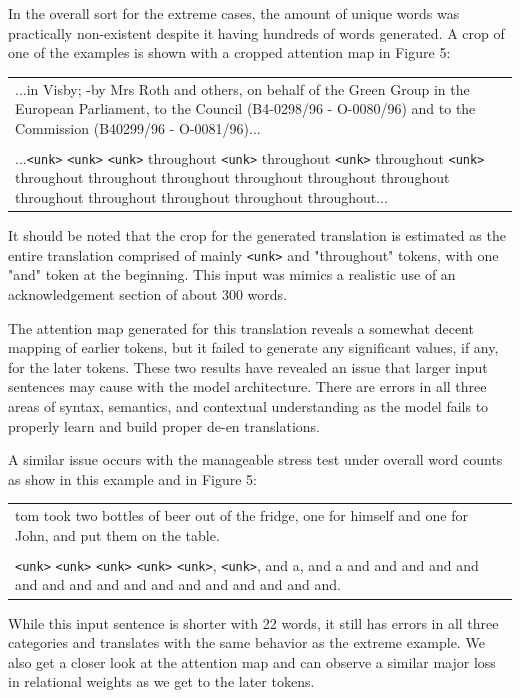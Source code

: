 \documentclass[11pt,a4paper]{article}
\begin{document}
In the overall sort for the extreme cases, the amount of unique words was practically non-existent despite it having hundreds of words generated. A crop of one of the examples is shown with a cropped attention map in Figure 5:
\begin{center}
\begin{tabular}{p{2.5in}}
    \hline
    ...in Visby; -by Mrs Roth and others, on behalf of the Green Group in the European Parliament, to the Council (B4-0298/96 - O-0080/96) and to the Commission (B40299/96 - O-0081/96)...\\
    \\
    ...\verb|<unk>| \verb|<unk>| \verb|<unk>| throughout \verb|<unk>| throughout \verb|<unk>| throughout \verb|<unk>| throughout throughout throughout throughout throughout throughout throughout throughout throughout throughout throughout...\\
    \hline
\end{tabular}
\end{center}
It should be noted that the crop for the generated translation is estimated as the entire translation comprised of mainly \verb|<unk>| and "throughout"  tokens, with one "and" token at the beginning. This input was mimics a realistic use of an acknowledgement section of about 300 words. 

The attention map generated for this translation reveals a somewhat decent mapping of earlier tokens, but it failed to generate any significant values, if any, for the later tokens. These two results have revealed an issue that larger input sentences may cause with the model architecture. There are errors in all three areas of syntax, semantics, and contextual understanding as the model fails to properly learn and build proper de-en translations.

A similar issue occurs with the manageable stress test under overall word counts as show in this example and in Figure 5:
\begin{center}
\begin{tabular}{p{2.5in}}
    \hline
    tom took two bottles of beer out of the fridge, one for himself and one for John, and put them on the table.\\
    \\
    \verb|<unk>| \verb|<unk>| \verb|<unk>| \verb|<unk>| \verb|<unk>|, \verb|<unk>|, and a, and a and and and and and and and and and and and and and and and and and.\\
    \hline
\end{tabular}
\end{center}
While this input sentence is shorter with 22 words, it still has errors in all three categories and translates with the same behavior as the extreme example. We also get a closer look at the attention map and can observe a similar major loss in relational weights as we get to the later tokens. 
\end{document}
